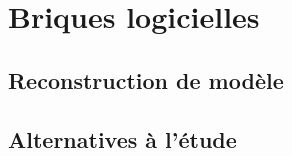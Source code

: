 \renewcommand{\chpath}{3-briques/}
\renewcommand{\imgpath}{\chpath img/}
\renewcommand{\secpath}{\chpath}
\chapter{Briques logicielles}
\label{chap:briques}


\section{Reconstruction de modèle}





















\section{Alternatives à l'étude}



